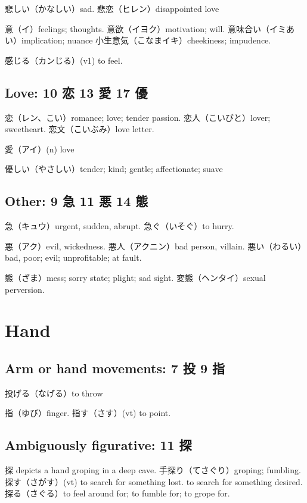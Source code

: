 悲しい（かなしい）sad.
悲恋（ヒレン）disappointed love

意（イ）feelings; thoughts.
意欲（イヨク）motivation; will.
意味合い（イミあい）implication; nuance
小生意気（こなまイキ）cheekiness; impudence.

感じる（カンじる）(v1) to feel.

\subsection{Love: 10 恋 13 愛 17 優}

恋（レン、こい）romance; love; tender passion.
恋人（こいびと）lover; sweetheart.
恋文（こいぶみ）love letter.

愛（アイ）(n) love

優しい（やさしい）tender; kind; gentle; affectionate; suave

\subsection{Other: 9 急 11 悪 14 態}

急（キュウ）urgent, sudden, abrupt.
急ぐ（いそぐ）to hurry.

悪（アク）evil, wickedness.
悪人（アクニン）bad person, villain.
悪い（わるい）bad, poor; evil; unprofitable; at fault.

態（ざま）mess; sorry state; plight; sad sight.
変態（ヘンタイ）sexual perversion.

\section{Hand}

\subsection{Arm or hand movements: 7 投 9 指}

投げる（なげる）to throw

指（ゆび）finger.
指す（さす）(vt) to point.

\subsection{Ambiguously figurative: 11 探}

探 depicts a hand groping in a deep cave.
手探り（てさぐり）groping; fumbling.
探す（さがす）(vt)
to search for something lost.
to search for something desired.
探る（さぐる）to feel around for; to fumble for; to grope for.

